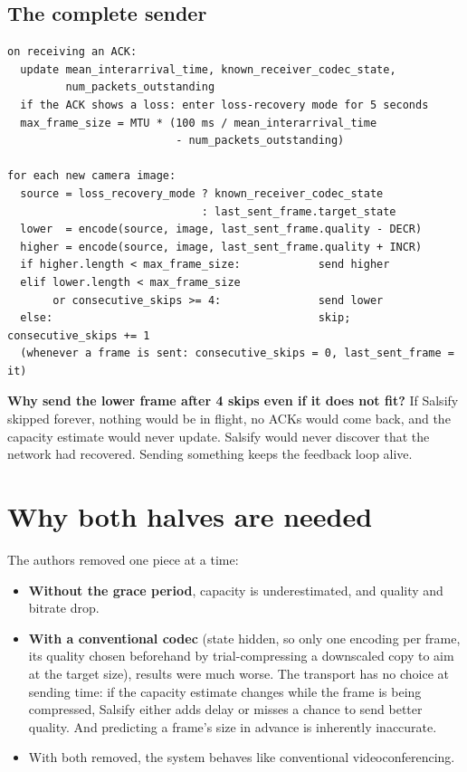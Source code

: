 \subsection{The complete sender}
\begin{lstlisting}
on receiving an ACK:
  update mean_interarrival_time, known_receiver_codec_state,
         num_packets_outstanding
  if the ACK shows a loss: enter loss-recovery mode for 5 seconds
  max_frame_size = MTU * (100 ms / mean_interarrival_time
                          - num_packets_outstanding)

for each new camera image:
  source = loss_recovery_mode ? known_receiver_codec_state
                              : last_sent_frame.target_state
  lower  = encode(source, image, last_sent_frame.quality - DECR)
  higher = encode(source, image, last_sent_frame.quality + INCR)
  if higher.length < max_frame_size:            send higher
  elif lower.length < max_frame_size
       or consecutive_skips >= 4:               send lower
  else:                                         skip; consecutive_skips += 1
  (whenever a frame is sent: consecutive_skips = 0, last_sent_frame = it)
\end{lstlisting}
\textbf{Why send the lower frame after 4 skips even if it does not fit?} If Salsify skipped forever, nothing would be in flight, no ACKs would come back,
and the capacity estimate would never update. Salsify would never discover that the network had recovered. Sending something keeps the feedback loop
alive.

\section{Why both halves are needed}
The authors removed one piece at a time:
\begin{itemize}
  \item \textbf{Without the grace period}, capacity is underestimated, and quality and bitrate drop.
  \item \textbf{With a conventional codec} (state hidden, so only one encoding per frame, its quality chosen beforehand by trial-compressing a downscaled
        copy to aim at the target size), results were much worse. The transport has no choice at sending time: if the capacity estimate changes while the
        frame is being compressed, Salsify either adds delay or misses a chance to send better quality. And predicting a frame's size in advance is
        inherently inaccurate.
  \item With both removed, the system behaves like conventional videoconferencing.
\end{itemize}

